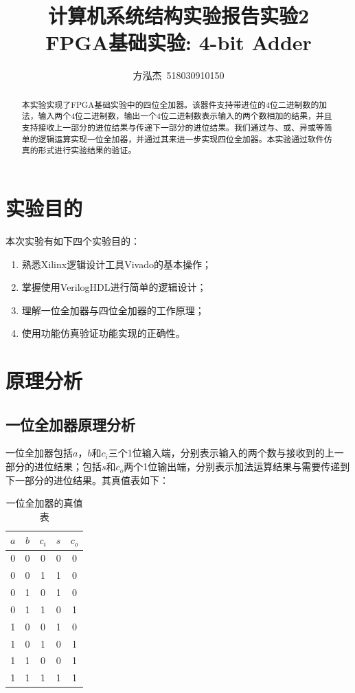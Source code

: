 \documentclass{cumcm}
\title{\textbf{计算机系统结构实验报告\quad 实验2}\\{\Large FPGA基础实验: 4-bit Adder}}
\author{方泓杰\ 518030910150}
\numberwithin{equation}{section}
\numberwithin{equation}{subsection}
\begin{document}
\maketitle

\begin{abstract}
  本实验实现了FPGA基础实验中的四位全加器。该器件支持带进位的$4$位二进制数的加法，输入两个$4$位二进制数，输出一个$4$位二进制数表示输入的两个数相加的结果，并且支持接收上一部分的进位结果与传递下一部分的进位结果。我们通过与、或、异或等简单的逻辑运算实现一位全加器，并通过其来进一步实现四位全加器。本实验通过软件仿真的形式进行实验结果的验证。
\end{abstract}

\maketitle \tableofcontents
\newpage

\section{实验目的}\label{section1}
本次实验有如下四个实验目的：
\begin{enumerate}
    \item 熟悉Xilinx逻辑设计工具Vivado的基本操作；
    \item 掌握使用VerilogHDL进行简单的逻辑设计；
    \item 理解一位全加器与四位全加器的工作原理；
    \item 使用功能仿真验证功能实现的正确性。
\end{enumerate}

\section{原理分析}\label{section2}
\subsection{一位全加器原理分析}\label{section2.1}
一位全加器包括$a$，$b$和$c_i$三个1位输入端，分别表示输入的两个数与接收到的上一部分的进位结果；包括$s$和$c_o$两个1位输出端，分别表示加法运算结果与需要传递到下一部分的进位结果。其真值表如下：

\begin{table}[htbp]
    \centering
    \begin{tabular}{|ccc|cc|}
         \hline
         $a$ & $b$ & $c_i$ & $s$ & $c_o$\\
         \hline
         0 & 0 & 0 & 0 & 0 \\
         0 & 0 & 1 & 1 & 0 \\
         0 & 1 & 0 & 1 & 0 \\
         0 & 1 & 1 & 0 & 1 \\
         1 & 0 & 0 & 1 & 0 \\
         1 & 0 & 1 & 0 & 1 \\
         1 & 1 & 0 & 0 & 1 \\
         1 & 1 & 1 & 1 & 1 \\
         \hline
    \end{tabular}
    \caption{一位全加器的真值表}
    \label{tab1}
\end{table}
\end{document}
